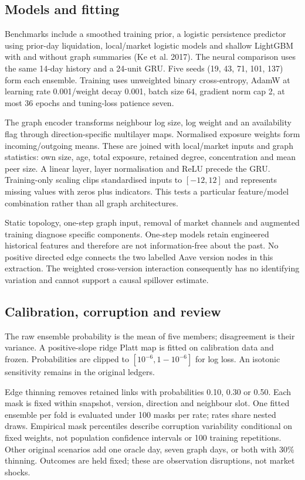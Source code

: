 \documentclass[
  10pt,
  a4paper,
]{article}
\begin{document}
\subsection{Models and fitting}\label{models-and-fitting}

Benchmarks include a smoothed training prior, a logistic persistence
predictor using prior-day liquidation, local/market logistic models and
shallow LightGBM with and without graph summaries (Ke et al. 2017). The
neural comparison uses the same 14-day history and a 24-unit GRU. Five
seeds (19, 43, 71, 101, 137) form each ensemble. Training uses
unweighted binary cross-entropy, AdamW at learning rate 0.001/weight
decay 0.001, batch size 64, gradient norm cap 2, at most 36 epochs and
tuning-loss patience seven.

The graph encoder transforms neighbour log size, log weight and an
availability flag through direction-specific multilayer maps. Normalised
exposure weights form incoming/outgoing means. These are joined with
local/market inputs and graph statistics: own size, age, total exposure,
retained degree, concentration and mean peer size. A linear layer, layer
normalisation and ReLU precede the GRU. Training-only scaling clips
standardised inputs to \([-12,12]\) and represents missing values with
zeros plus indicators. This tests a particular feature/model combination
rather than all graph architectures.

Static topology, one-step graph input, removal of market channels and
augmented training diagnose specific components. One-step models retain
engineered historical features and therefore are not information-free
about the past. No positive directed edge connects the two labelled Aave
version nodes in this extraction. The weighted cross-version interaction
consequently has no identifying variation and cannot support a causal
spillover estimate.

\subsection{Calibration, corruption and
review}\label{calibration-corruption-and-review}

The raw ensemble probability is the mean of five members; disagreement
is their variance. A positive-slope ridge Platt map is fitted on
calibration data and frozen. Probabilities are clipped to
\([10^{-6},1-10^{-6}]\) for log loss. An isotonic sensitivity remains in
the original ledgers.

Edge thinning removes retained links with probabilities 0.10, 0.30 or
0.50. Each mask is fixed within snapshot, version, direction and
neighbour slot. One fitted ensemble per fold is evaluated under 100
masks per rate; rates share nested draws. Empirical mask percentiles
describe corruption variability conditional on fixed weights, not
population confidence intervals or 100 training repetitions. Other
original scenarios add one oracle day, seven graph days, or both with
30\% thinning. Outcomes are held fixed; these are observation
disruptions, not market shocks.
\end{document}
